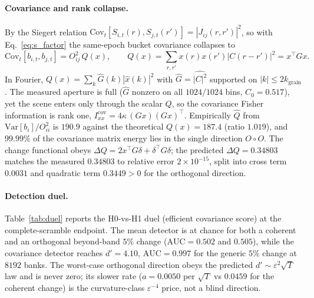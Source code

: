 \documentclass[aps,prl,onecolumn,notitlepage,nofootinbib,superscriptaddress]{revtex4-2}
\newcommand{\eps}{\varepsilon}
\begin{document}
\paragraph*{Covariance and rank collapse.}
By the Siegert relation $\mathrm{Cov}_t[S_{i,t}(r),S_{j,t}(r')]=|J_{ij}(r,r')|^2$,
so with Eq.~\eqref{eq:s_factor} the same-epoch bucket covariance collapses to
\begin{equation}
\mathrm{Cov}_t[b_{i,t},b_{j,t}]=O_{ij}^2\,Q(x),\qquad
Q(x)=\sum_{r,r'}x(r)x(r')|C(r-r')|^2=x^{\!\top}Gx .
\label{eq:s_Q}
\end{equation}
In Fourier, $Q(x)=\sum_k\hat{G}(k)|\hat{x}(k)|^2$ with $\hat{G}=\widehat{|C|^2}$
supported on $|k|\le2k_{\mathrm{grain}}$. The measured aperture is full
($\hat{G}$ nonzero on all $1024/1024$ bins, $C_0=0.517$), yet the scene enters
only through the scalar $Q$, so the covariance Fisher information is rank one,
$I^{\mathrm{cov}}_{xx}=4\kappa\,(Gx)(Gx)^{\!\top}$. Empirically
$\hat{Q}$ from $\mathrm{Var}[b_i]/O_{ii}^2$ is $190.9$ against the theoretical
$Q(x)=187.4$ (ratio $1.019$), and $99.99\%$ of the covariance matrix energy lies
in the single direction $O\!\circ\!O$. The change functional obeys
$\Delta Q=2x^{\!\top}G\delta+\delta^{\!\top}G\delta$; the predicted
$\Delta Q=0.34803$ matches the measured $0.34803$ to relative error
$2\times10^{-15}$, split into cross term $0.0031$ and quadratic term $0.3449>0$
for the orthogonal direction.

\paragraph*{Detection duel.}
Table~\ref{tab:duel} reports the H0-vs-H1 duel (efficient covariance score) at
the complete-scramble endpoint. The mean detector is at chance for both a
coherent and an orthogonal beyond-band $5\%$ change ($\mathrm{AUC}=0.502$ and
$0.505$), while the covariance detector reaches $d'=4.10$, $\mathrm{AUC}=0.997$
for the generic $5\%$ change at $8192$ banks. The worst-case orthogonal
direction obeys the predicted $d'\!\sim\!\eps^2\sqrt{T}$ law and is never zero;
its slower rate ($a=0.0050$ per $\sqrt{T}$ vs $0.0459$ for the coherent change)
is the curvature-class $\eps^{-4}$ price, not a blind direction.
\end{document}
